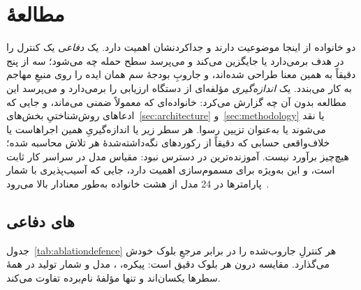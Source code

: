 \section{مطالعهٔ }
\label{sec:ablation}

دو خانواده از  اینجا موضوعیت دارند و جداکردنشان اهمیت دارد.
یک \emph{ دفاعی} یک کنترل را در هدف برمی‌دارد یا جایگزین
می‌کند و می‌پرسد سطح حمله چه می‌شود؛ سه  از پنج 
دقیقاً به همین معنا طراحی شده‌اند، و جاروبِ بودجهٔ سم همان ایده را روی
منبعِ مهاجم به کار می‌بندد. یک \emph{ اندازه‌گیری} مؤلفه‌ای از
دستگاه ارزیابی را برمی‌دارد و می‌پرسد این مطالعه بدون آن چه گزارش می‌کرد:
خانواده‌ای که معمولاً ضمنی می‌ماند، و جایی که ادعاهای روش‌شناختیِ
بخش‌های~\ref{sec:architecture} و~\ref{sec:methodology} یا نقد می‌شوند یا
به‌عنوان تزیین رسوا. هر سطر زیر یا اندازه‌گیریِ همین اجراهاست یا خلاف‌واقعی
حسابی که دقیقاً از رکوردهای نگه‌داشته‌شدهٔ هر تلاش محاسبه شده؛ هیچ‌چیز برآورد
نیست. آموزنده‌ترین  در دسترس نبود: مقیاس مدل در سراسر کار
ثابت است، و این به‌ویژه برای مسموم‌سازی اهمیت دارد، جایی که آسیب‌پذیری با
شمار پارامترها در \num{24} مدل از هشت خانواده به‌طور معنادار بالا
می‌رود~\cite[]{bowen2025scaling}.

\subsection{‌های دفاعی}
\label{sec:abl:defence}

جدول~\ref{tab:ablationdefence} هر کنترلِ جاروب‌شده را در برابر مرجعِ بلوک
خودش می‌گذارد. مقایسه درون هر بلوک دقیق است: پیکره، ، مدل و
شمار تولید در همهٔ سطرها یکسان‌اند و تنها مؤلفهٔ نام‌برده تفاوت می‌کند.

